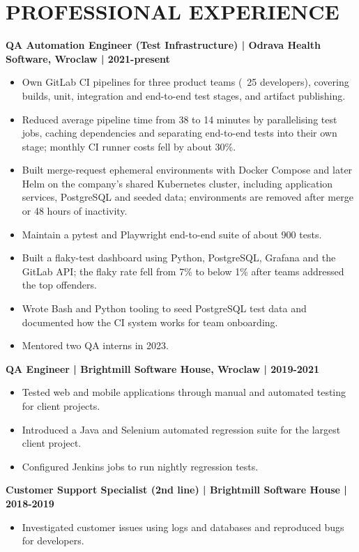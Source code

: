 \documentclass[11pt,a4paper]{article}
\begin{document}
\section*{PROFESSIONAL EXPERIENCE}
\textbf{QA Automation Engineer (Test Infrastructure) | Odrava Health Software, Wroclaw | 2021-present}
\begin{itemize}[label=-]
\item Own GitLab CI pipelines for three product teams (~25 developers), covering builds, unit, integration and end-to-end test stages, and artifact publishing.
\item Reduced average pipeline time from 38 to 14 minutes by parallelising test jobs, caching dependencies and separating end-to-end tests into their own stage; monthly CI runner costs fell by about 30\%.
\item Built merge-request ephemeral environments with Docker Compose and later Helm on the company's shared Kubernetes cluster, including application services, PostgreSQL and seeded data; environments are removed after merge or 48 hours of inactivity.
\item Maintain a pytest and Playwright end-to-end suite of about 900 tests.
\item Built a flaky-test dashboard using Python, PostgreSQL, Grafana and the GitLab API; the flaky rate fell from 7\% to below 1\% after teams addressed the top offenders.
\item Wrote Bash and Python tooling to seed PostgreSQL test data and documented how the CI system works for team onboarding.
\item Mentored two QA interns in 2023.
\end{itemize}

\textbf{QA Engineer | Brightmill Software House, Wroclaw | 2019-2021}
\begin{itemize}[label=-]
\item Tested web and mobile applications through manual and automated testing for client projects.
\item Introduced a Java and Selenium automated regression suite for the largest client project.
\item Configured Jenkins jobs to run nightly regression tests.
\end{itemize}

\textbf{Customer Support Specialist (2nd line) | Brightmill Software House | 2018-2019}
\begin{itemize}[label=-]
\item Investigated customer issues using logs and databases and reproduced bugs for developers.
\end{itemize}
\end{document}
